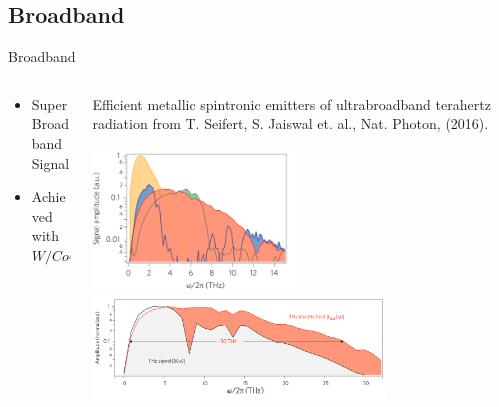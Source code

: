 \documentclass[aspectratio=1610, 9pt]{beamer}
\begin{document}
\subsection{Broadband}
\begin{frame}{Broadband}
  \begin{columns}
    \begin{column}{.3\textwidth}
      \begin{itemize}
        \item Super Broadband Signal
        \vspace{0.3in}
        \item Achieved with $W/Co40 Fe40 B 20 /Pt\;(\SI{5.8}{\nano\meter})$
      \end{itemize}
    \end{column}
    \begin{column}{.7\textwidth}
      \small\textcolor{tugreen}{Efficient metallic spintronic emitters of ultrabroadband terahertz radiation} from T. Seifert, S. Jaiswal et. al., Nat. Photon, (2016).
      \vspace{0.1in}
      \begin{center}
      \includegraphics[width=0.5\textwidth]{pics/broadband_comnpar.png} 
      \includegraphics[width=0.7\textwidth]{pics/broadband.png}
      \end{center}
    \end{column}
  \end{columns}
\end{frame}
\end{document}
